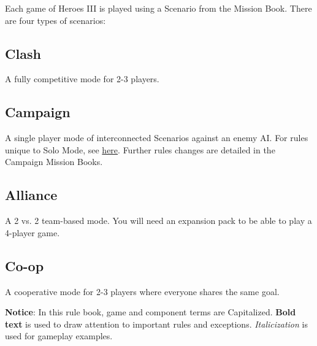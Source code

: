 Each game of Heroes III is played using a Scenario from the Mission Book.
There are four types of scenarios:

\subsection*{Clash}
A fully competitive mode for 2-3 players.

\subsection*{Campaign}
A single player mode of interconnected Scenarios against an enemy AI.
For rules unique to Solo Mode, see \hyperlink{AIrules}{here}.
Further rules changes are detailed in the Campaign Mission Books.

\subsection*{Alliance}
A 2 vs.
2 team-based mode.
You will need an expansion pack to be able to play a 4-player game.

\subsection*{Co-op}
A cooperative mode for 2-3 players where everyone shares the same goal.\vspace*{\fill}

\textbf{Notice}: In this rule book, game and component terms are Capitalized.
\textbf{Bold text} is used to draw attention to important rules and exceptions.
\textit{Italicization} is used for gameplay examples.

\clearpage
